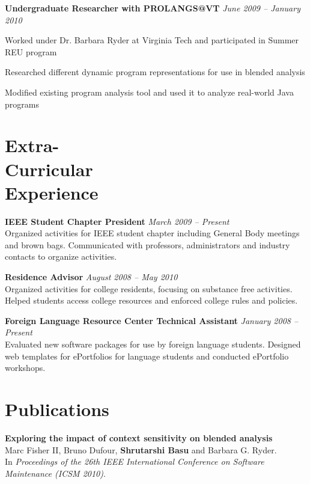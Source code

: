 \documentclass[margin,line]{resume}
\begin{document}
\begin{resume}
    {\bf Undergraduate Researcher with PROLANGS@VT } \hfill   {\sl June 2009 -- January 2010}
    \begin{list2}
    	\item Worked under Dr. Barbara Ryder at Virginia Tech and participated in Summer REU program
    	\item Researched different dynamic program representations for use in blended analysis
    	\item Modified existing program analysis tool and used it to analyze real-world Java programs
    \end{list2}

    \section{Extra-\\Curricular\\Experience} 
    
    {\bf IEEE Student Chapter President} \hfill {\sl March 2009 -- Present} \\
    Organized activities for IEEE student chapter including General Body meetings and brown bags.
    Communicated with professors, administrators and industry contacts to organize activities. 

    {\bf Residence Advisor} \hfill {\sl August 2008 -- May 2010} \\
    Organized activities for college residents, focusing on substance free activities. 
    Helped students access college resources and enforced college rules and policies.

    {\bf Foreign Language Resource Center Technical Assistant} \hfill {\sl January 2008 -- Present}\\
    Evaluated new software packages for use by foreign language students.
    Designed web templates for ePortfolios for language students and conducted ePortfolio workshops.


    \section{Publications}
    {\bf Exploring the impact of context sensitivity on blended analysis} \\
    Marc Fisher II, Bruno Dufour, {\bf Shrutarshi Basu} and Barbara G. Ryder.\\
    In \emph{Proceedings of the 26th IEEE International Conference
      on Software Maintenance (ICSM 2010)}.
    

\end{resume}
\end{document}
